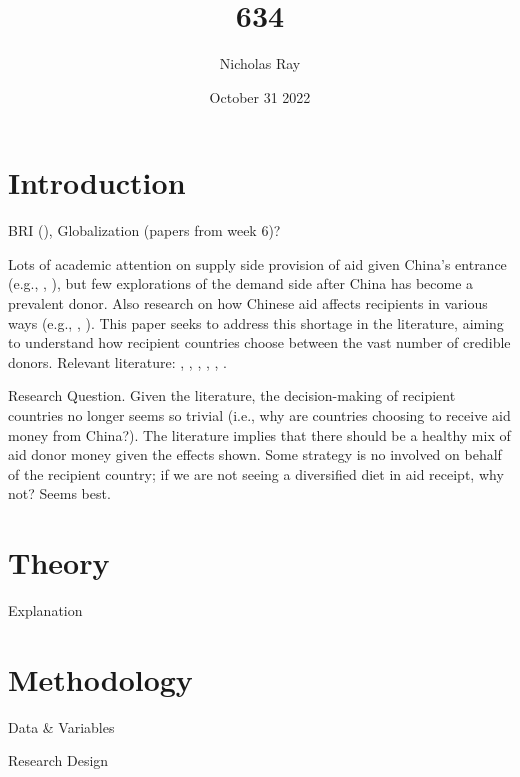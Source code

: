 \documentclass{article}
\title{\vspace{-2.75cm}634\vspace{-0.5cm}}
\author{Nicholas Ray}
\date{\vspace{-0.30cm}October 31 2022\vspace{-1cm}}
\begin{document}
\maketitle
\section*{Introduction}
BRI (\cite{dreher2022}), Globalization (papers from week 6)? 

Lots of academic attention on supply side provision of aid given China's entrance (e.g., \cite{dreher2018}, \cite{dreher2015}), but few explorations of the demand side after China has become a prevalent donor. Also research on how Chinese aid affects recipients in various ways (e.g., \cite{martorano2020}, \cite{bader2015}).
This paper seeks to address this shortage in the literature, aiming to understand how recipient countries choose between the vast number of credible donors. Relevant literature: \cite{kilama2016a}, \cite{hernandez2017}, \cite{li2017a}, \cite{isaksson2018}, \cite{humphrey2019}, \cite{broich2017a}.

Research Question. Given the literature, the decision-making of recipient countries no longer seems so trivial (i.e., why are countries choosing to receive aid money from China?). The literature implies that there should be a healthy mix of aid donor money given the effects shown. Some strategy is no involved on behalf of the recipient country; if we are not seeing a diversified diet in aid receipt, why not? Seems best.

\section*{Theory}
Explanation

\section*{Methodology}
Data \& Variables

Research Design

\pagebreak
\printbibliography
\end{document}
